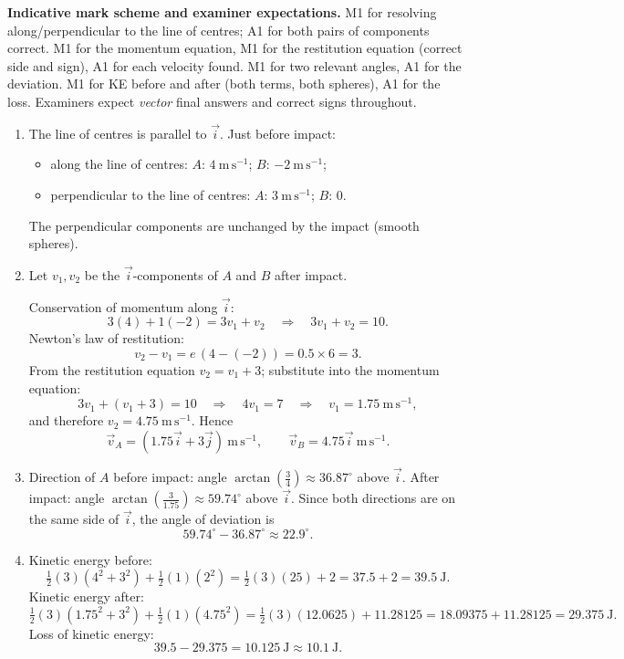 \documentclass[11pt]{article}
\begin{document}
\begin{corrige}
\textbf{Indicative mark scheme and examiner expectations.} M1 for resolving along/perpendicular to the line of centres; A1 for both pairs of components correct. M1 for the momentum equation, M1 for the restitution equation (correct side and sign), A1 for each velocity found. M1 for two relevant angles, A1 for the deviation. M1 for KE before and after (both terms, both spheres), A1 for the loss. Examiners expect \emph{vector} final answers and correct signs throughout.

\begin{enumerate}
\item The line of centres is parallel to $\vec{i}$. Just before impact:
\begin{itemize}
\item along the line of centres: $A$: $4\ \mathrm{m\,s^{-1}}$; $B$: $-2\ \mathrm{m\,s^{-1}}$;
\item perpendicular to the line of centres: $A$: $3\ \mathrm{m\,s^{-1}}$; $B$: $0$.
\end{itemize}
The perpendicular components are unchanged by the impact (smooth spheres).
\item Let $v_{1},v_{2}$ be the $\vec{i}$-components of $A$ and $B$ after impact.

Conservation of momentum along $\vec{i}$:
\[ 3(4)+1(-2)=3v_{1}+v_{2}\quad\Longrightarrow\quad 3v_{1}+v_{2}=10. \]
Newton's law of restitution:
\[ v_{2}-v_{1}=e\,(4-(-2))=0.5\times 6=3. \]
From the restitution equation $v_{2}=v_{1}+3$; substitute into the momentum equation:
\[ 3v_{1}+(v_{1}+3)=10 \quad\Longrightarrow\quad 4v_{1}=7 \quad\Longrightarrow\quad v_{1}=1.75\ \mathrm{m\,s^{-1}}, \]
and therefore $v_{2}=4.75\ \mathrm{m\,s^{-1}}$. Hence
\[ \vec{v}_{A}=(1.75\vec{i}+3\vec{j})\ \mathrm{m\,s^{-1}},\qquad \vec{v}_{B}=4.75\vec{i}\ \mathrm{m\,s^{-1}}. \]
\item Direction of $A$ before impact: angle $\arctan\!\left(\tfrac{3}{4}\right)\approx 36.87^{\circ}$ above $\vec{i}$. After impact: angle $\arctan\!\left(\tfrac{3}{1.75}\right)\approx 59.74^{\circ}$ above $\vec{i}$. Since both directions are on the same side of $\vec{i}$, the angle of deviation is
\[ 59.74^{\circ}-36.87^{\circ}\approx 22.9^{\circ}. \]
\item Kinetic energy before:
\[ \tfrac12(3)(4^{2}+3^{2})+\tfrac12(1)(2^{2})=\tfrac12(3)(25)+2=37.5+2=39.5\ \mathrm{J}. \]
Kinetic energy after:
\[ \tfrac12(3)(1.75^{2}+3^{2})+\tfrac12(1)(4.75^{2})=\tfrac12(3)(12.0625)+11.28125=18.09375+11.28125=29.375\ \mathrm{J}. \]
Loss of kinetic energy:
\[ 39.5-29.375=10.125\ \mathrm{J}\approx 10.1\ \mathrm{J}. \]
\end{enumerate}
\end{corrige}
\end{document}
